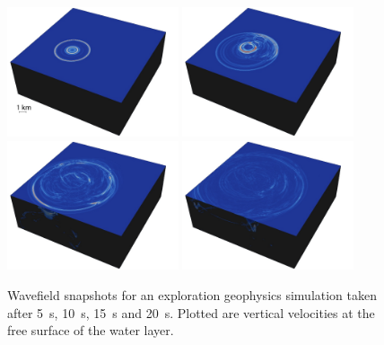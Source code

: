 \documentclass[referee,extra]{gji}
\begin{document}
\begin{figure}
\begin{center}
\includegraphics[width=0.45\textwidth]{./images/salt-mesh_1_0005.jpg}
\includegraphics[width=0.45\textwidth]{./images/salt-mesh_1_0010.jpg}
\includegraphics[width=0.45\textwidth]{./images/salt-mesh_1_0015.jpg}
\includegraphics[width=0.45\textwidth]{./images/salt-mesh_1_0020.jpg}
\end{center}
\caption{Wavefield snapshots for an exploration geophysics simulation taken after 5~s,
10~s, 15~s and 20~s.
Plotted are vertical velocities at the free surface of the water layer.
}
\label{figure:saltdome}
\end{figure}
\end{document}

